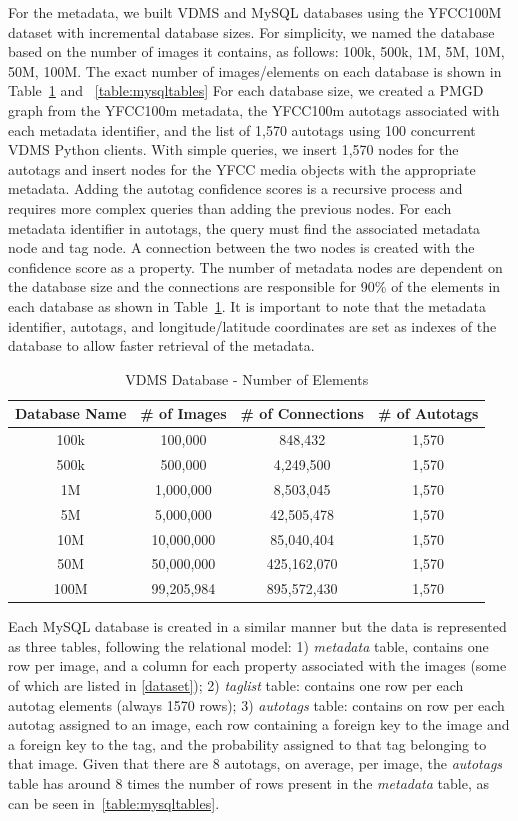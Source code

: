 For the metadata, we built VDMS and MySQL databases
using the YFCC100M dataset with incremental database sizes.
For simplicity, we named the database based on the number of images
it contains, as follows: 100k, 500k, 1M, 5M, 10M, 50M, 100M.
The exact number of images/elements on each database is shown in
Table~\ref{table:vdmsnodes} and ~\ref{table:mysqltables}
For each database size, we created a PMGD graph from the YFCC100m metadata,
the YFCC100m autotags associated with each metadata identifier,
and the list of 1,570 autotags using 100 concurrent VDMS Python clients.
With simple queries, we insert 1,570 nodes for the autotags and insert nodes
for the YFCC media objects with the appropriate metadata.
Adding the autotag confidence scores is a recursive process and requires more
complex queries than adding the previous nodes.
For each metadata identifier in autotags, the query must find the associated
metadata node and tag node.
A connection between the two nodes is created with the confidence score as a
property. The number of metadata nodes are dependent on the database size and
the connections are responsible for 90\% of the elements in each database as
shown in Table~\ref{table:vdmsnodes}.
It is important to note that the metadata identifier, autotags, and
longitude/latitude coordinates are set as indexes of the database to allow
faster retrieval of the metadata.

\begin{table}[h]
\caption{VDMS Database - Number of Elements}
\centering
\begin{tabular}{c c c c}
\hline\hline
Database Name & \# of Images & \# of Connections & \# of Autotags\\
\hline
100k & 100,000     & 848,432      & 1,570\\
500k & 500,000     & 4,249,500    & 1,570\\
1M   & 1,000,000   & 8,503,045    & 1,570\\
5M   & 5,000,000   & 42,505,478   & 1,570\\
10M  & 10,000,000  & 85,040,404   & 1,570\\
50M  & 50,000,000  & 425,162,070  & 1,570\\
100M & 99,205,984  & 895,572,430  & 1,570\\
\hline
\end{tabular}
\label{table:vdmsnodes}
\end{table}

Each MySQL database is created in a similar manner but the data is represented
as three tables, following the relational model:
1) \textit{metadata} table, contains one row per image,
and a column for each property
associated with the images (some of which are listed in \ref{dataset});
2) \textit{taglist} table: contains one row per each autotag elements
(always 1570 rows);
3) \textit{autotags} table: contains on row per each autotag
assigned to an image, each row containing a foreign key to the
image and a foreign key to the tag, and
the probability assigned to that tag belonging to that image.
Given that there are 8 autotags, on average, per image, the \textit{autotags}
table has around 8 times the number of rows present in the
\textit{metadata} table, as can be seen in~\ref{table:mysqltables}.

